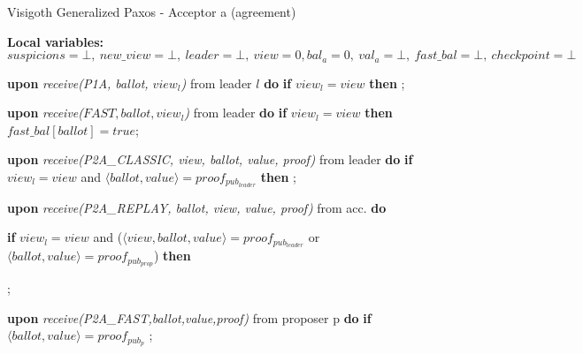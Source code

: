 \begin{algorithm} 
	\caption{Visigoth Generalized Paxos - Acceptor a (agreement)}
	\label{VFT-Acc}
	\textbf{Local variables:} $suspicions = \bot,\ new\_view = \bot,\ leader = \bot,\ view = 0, bal_a = 0,\ val_a = \bot,\ fast\_bal = \bot,\ checkpoint=\bot$
	\begin{algorithmic}[1]
		\State \textbf{upon} \textit{receive(P1A, ballot, $view_l$)} from leader $l$ \textbf{do}
		\State \hspace{\algorithmicindent} \textbf{if} $view_l = view$ \textbf{then}
		\State \hspace{\algorithmicindent}\hspace{\algorithmicindent} ;
		
		\State
		\State \textbf{upon} \textit{receive($FAST,ballot,view_l$)} from leader \textbf{do}
		\State \hspace{\algorithmicindent} \textbf{if} $view_l = view$ \textbf{then}
		\State \hspace{\algorithmicindent}\hspace{\algorithmicindent} $fast\_bal[ballot] = true$;
		
		\State
		\State \textbf{upon} \textit{receive(P2A\_CLASSIC, view, ballot, value, proof)} from leader \textbf{do}
		\State \hspace{\algorithmicindent} \textbf{if} $view_l = view$ and $\langle ballot, value \rangle = proof_{pub_{leader}}$ \textbf{then}
		\State \hspace{\algorithmicindent}\hspace{\algorithmicindent} ; 
		
		\State
		\State \textbf{upon} \textit{receive(P2A\_REPLAY, ballot, view, value, proof)} from acc. \textbf{do}
		\State \hspace{\algorithmicindent} 
		\parbox[t]{\dimexpr\linewidth-\marginparwidth}{ \textbf{if} $view_l = view$ and ($\langle view, ballot, value \rangle = proof_{pub_{leader}}$ or $\langle ballot, value \rangle = proof_{pub_{prop}}$) \textbf{then}}
		\State \hspace{\algorithmicindent}\hspace{\algorithmicindent} ; 

		\State		
		\State \textbf{upon} \textit{receive(P2A\_FAST,ballot,value,proof)} from proposer p \textbf{do}
		\State \hspace{\algorithmicindent} \textbf{if} $\langle ballot, value \rangle = proof_{pub_p}$
		\State \hspace{\algorithmicindent}\hspace{\algorithmicindent} ;


\end{algorithmic}
\end{algorithm}
